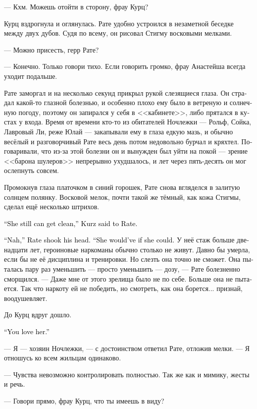\documentclass[a4paper,12pt,fleqn]{book}\usepackage{cooltooltips}\usepackage{polyglossia}\setdefaultlanguage[babelshorthands=true]{russian}\setotherlanguage{english}\defaultfontfeatures{Ligatures=TeX,Mapping=tex-text} \usepackage{xcolor}\definecolor{lightgray}{HTML}{bbbbbb}\color{lightgray}\newcommand{\ml}[3]{\textenglish{\textcolor{black}{#3}}}
\begin{document}
--- Кхм.
Можешь отойти в сторону, фрау Курц?

Курц вздрогнула и оглянулась.
Рате удобно устроился в незаметной беседке между двух дубов.
Судя по всему, он рисовал Стигму восковыми мелками.

--- Можно присесть, герр Рате?

--- Конечно.
Только говори тихо.
Если говорить громко, фрау Анастейша всегда уходит подальше.

Рате заморгал и на несколько секунд прикрыл рукой слезящиеся глаза.
Он страдал какой-то глазной болезнью, и особенно плохо ему было в ветреную и солнечную погоду, поэтому он запирался у себя в <<кабинете>>, либо прятался в кустах у входа.
Время от времени кто-то из обитателей Ночлежки --- Рольф, Сойка, Лавровый Ли, реже Юлай --- закапывали ему в глаза едкую мазь, и обычно весёлый и разговорчивый Рате весь день потом недовольно бурчал и кряхтел. %
Поговаривали, что из-за этой болезни он и вынужден был уйти на покой --- зрение <<барона шулеров>> непрерывно ухудшалось, и лет через пять-десять он мог ослепнуть совсем.

Промокнув глаза платочком в синий горошек, Рате снова вгляделся в залитую солнцем полянку.
Восковой мелок, почти такой же тёмный, как кожа Стигмы, сделал ещё несколько штрихов.

\ml{$0$}
{--- Она ещё может выбраться, --- сказала Курц Рате.}
{``She still can get clean,'' Kurz said to Rate.}

\ml{$0$}
{--- Неа, --- покачал головой Рате.}
{``Nah,'' Rate shook his head.}
\ml{$0$}
{--- Могла бы --- выбралась.}
{``She would've if she could.}
У неё стаж больше двенадцати лет, героиновые наркоманы обычно столько не живут.
Давно бы умерла, если бы не её дисциплина и тренировки.
Но слезть она точно не сможет.
Она пыталась пару раз уменьшить --- просто уменьшить --- дозу, --- Рате болезненно сморщился.
--- Даже мне от этого зрелища было не по себе.
Больше она не пытается.
Так что наркоту ей не победить, но смотреть, как она борется... признай, воодушевляет.

До Курц вдруг дошло.

\ml{$0$}
{--- Ты её любишь.}
{``You love her.''}

--- Я --- хозяин Ночлежки, --- с достоинством ответил Рате, отложив мелки.
--- Я отношусь ко всем жильцам одинаково.

--- Чувства невозможно контролировать полностью.
Так же как и мимику, жесты и речь.

--- Говори прямо, фрау Курц, что ты имеешь в виду?
\end{document}
